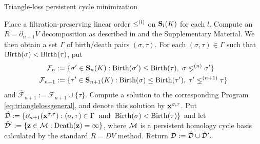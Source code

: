\begin{algorithm}
\caption{Triangle-loss persistent cycle minimization}
\label{alg:rdvvolumeoptimization}
\begin{algorithmic}[1]
\STATE Place a filtration-preserving linear order $\le^{(l)}$ on $\mathbf{S}_l(K)$ for each $l$.
\STATE Compute an $R = \partial_{n+1} V$ decomposition as described in \cite{cohen2006vines} and the Supplementary Material.  We then obtain a set $\Gamma$ 
 of birth/death pairs $(\sigma, \tau)$.
 \STATE For each $(\sigma, \tau) \in \Gamma$ such that $\mathrm{Birth}(\sigma) < \mathrm{Birth}(\tau)$,  put 
    \begin{align*}
        \mathcal{F}_n &:= \{\sigma' \in \mathbf{S}_n(K) : \mathrm{Birth}(\sigma') \le \mathrm{Birth}(\tau), \; \sigma \lneq^{(n)} \sigma'\} 
        \\
        \mathcal{F}_{n+1} &: = \{ \tau' \in \mathbf{S}_{n+1}(K) : \mathrm{Birth}(\sigma) \le \mathrm{Birth}(\tau'), \; \tau' \lneq^{(n+1)} \tau \} 
    \end{align*}
    and ${\hat {\mathcal{F}}}_{n+1}:= \mathcal{F}_{n+1} \cup \{\tau\}$.  Compute a  solution to the corresponding Program \eqref{eq:trianglelossgeneral}, and denote this solution by  $\mathbf{x}^{\sigma, \tau}$. 
    \STATE Put   
        $
            \hat {\mathcal D}: = \{ \partial_{n+1} (\mathbf{x}^{\sigma, \tau}) : (\sigma, \tau ) \in  \Gamma \; \text{ and } \; \mathrm{Birth}(\sigma) < \mathrm{Birth}(\tau)\}$ 
            and let $\hat {\mathcal D}' := \{ {\mathbf z} \in \mathcal M : \mathrm{Death}({\mathbf z}) = \infty  \}$, where $\mathcal M$ is a persistent homology cycle basis calculated by the standard $R=DV$ method.
    \STATE Return $\mathcal D: = \hat {\mathcal D} \cup \hat {\mathcal D}'.$
\end{algorithmic}
\end{algorithm}

